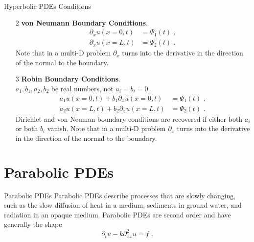 \documentclass[11pt]{beamer}
\begin{document}
\begin{frame}[fragile]{Hyperbolic PDEs Conditions}
\begin{enumerate}
\item[2] {\bf von Neumann Boundary Conditions}.\\ 
      \begin{equation}
      \begin{aligned}
      \partial_x u(x=0,t) &= \Psi_1(t)\,\,,\\
      \partial_x u(x=L,t) &= \Psi_2(t)\,\,.
      \end{aligned}
      \end{equation}
      Note that in a multi-D problem $\partial_x$ turns into
      the derivative in the direction of the normal to the boundary.

\item[3] {\bf Robin Boundary Conditions}.\\  $a_1, b_1, a_2, b_2$ be
      real numbers, not $a_i = b_i = 0$. \\
      \begin{equation}
      \begin{aligned}
      a_1 u(x=0,t) + b_1 \partial_x u(x=0,t) &= \Psi_1(t)\,\,,\\
      a_2 u(x=L,t) + b_2 \partial_x u(x=L,t) &= \Psi_2(t)\,\,.
      \end{aligned}
      \end{equation}
      Dirichlet and von Neuman boundary conditions are recovered if either
      both $a_i$ or both $b_i$ vanish.
      Note that in a multi-D problem $\partial_x$ turns into
      the derivative in the direction of the normal to the boundary.
\end{enumerate}
\end{frame}


\section{Parabolic PDEs}
\begin{frame}[fragile]{Parabolic PDEs}
Parabolic PDEs describe processes that are slowly changing, such as
the slow diffusion of heat in a medium, sediments in ground water, and
radiation in an opaque medium. Parabolic PDEs are second order and
have generally the shape
\begin{equation}
\partial_t u - k \partial^2_{xx} u = f\,\,.
\label{eq:pde_para1}
\end{equation}
\end{frame}
\end{document}
